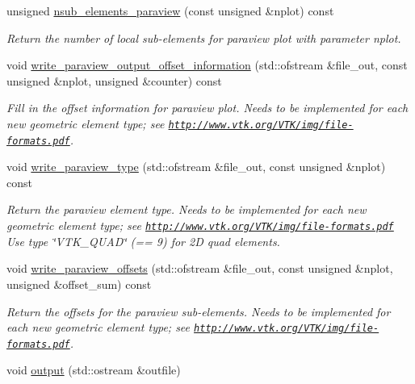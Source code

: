 \begin{DoxyCompactItemize}
unsigned \hyperlink{classoomph_1_1QElement_3_012_00_01NNODE__1D_01_4_ac7722f592ea96f7f1fc9b9de71fba1cb}{nsub\+\_\+elements\+\_\+paraview} (const unsigned \&nplot) const
\begin{DoxyCompactList}\small\item\em Return the number of local sub-\/elements for paraview plot with parameter nplot. \end{DoxyCompactList}\item 
void \hyperlink{classoomph_1_1QElement_3_012_00_01NNODE__1D_01_4_a9378c8bab357de6f4d8a89fd1ba61771}{write\+\_\+paraview\+\_\+output\+\_\+offset\+\_\+information} (std\+::ofstream \&file\+\_\+out, const unsigned \&nplot, unsigned \&counter) const
\begin{DoxyCompactList}\small\item\em Fill in the offset information for paraview plot. Needs to be implemented for each new geometric element type; see \href{http://www.vtk.org/VTK/img/file-formats.pdf}{\tt http\+://www.\+vtk.\+org/\+V\+T\+K/img/file-\/formats.\+pdf}. \end{DoxyCompactList}\item 
void \hyperlink{classoomph_1_1QElement_3_012_00_01NNODE__1D_01_4_a2e5c926cfb3b0cf3ef0d199ac4707c21}{write\+\_\+paraview\+\_\+type} (std\+::ofstream \&file\+\_\+out, const unsigned \&nplot) const
\begin{DoxyCompactList}\small\item\em Return the paraview element type. Needs to be implemented for each new geometric element type; see \href{http://www.vtk.org/VTK/img/file-formats.pdf}{\tt http\+://www.\+vtk.\+org/\+V\+T\+K/img/file-\/formats.\+pdf} Use type \char`\"{}\+V\+T\+K\+\_\+\+Q\+U\+A\+D\char`\"{} (== 9) for 2D quad elements. \end{DoxyCompactList}\item 
void \hyperlink{classoomph_1_1QElement_3_012_00_01NNODE__1D_01_4_a624bb632d2e6385346a288bdc3edafca}{write\+\_\+paraview\+\_\+offsets} (std\+::ofstream \&file\+\_\+out, const unsigned \&nplot, unsigned \&offset\+\_\+sum) const
\begin{DoxyCompactList}\small\item\em Return the offsets for the paraview sub-\/elements. Needs to be implemented for each new geometric element type; see \href{http://www.vtk.org/VTK/img/file-formats.pdf}{\tt http\+://www.\+vtk.\+org/\+V\+T\+K/img/file-\/formats.\+pdf}. \end{DoxyCompactList}\item 
void \hyperlink{classoomph_1_1QElement_3_012_00_01NNODE__1D_01_4_ab7bb815a43598e7ce0c4d10c511504fc}{output} (std\+::ostream \&outfile)

\end{DoxyCompactItemize}
